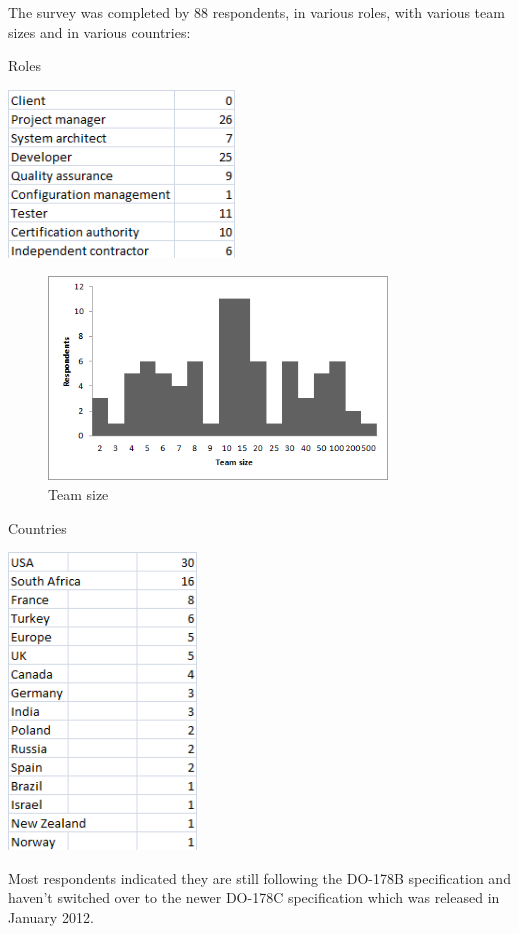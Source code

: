 \documentclass[conference]{IEEEtran}
\begin{document}
The survey was completed by 88 respondents, in various roles, with various team sizes and in various countries:
\begin{table}[t!]
\centering
\caption{Roles}
\includegraphics[width=60mm]{Roles.png}
\end{table}

\begin{figure}[t!]
\centering
\includegraphics[width=90mm]{Teams.png}
\caption{Team size}
\end{figure}

\begin{table}[t!]
\centering
\caption{Countries}
\includegraphics[width=50mm]{Countries.png}
\end{table}

Most respondents indicated they are still following the DO-178B specification and haven't switched over to the newer DO-178C specification which was released in January 2012.
\end{document}
